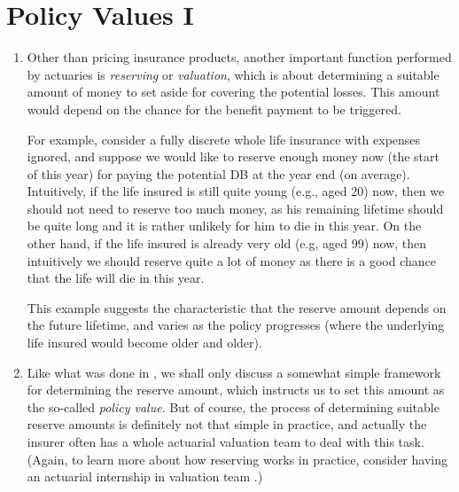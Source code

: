 \section{Policy Values I}
\label{sect:policy-values}
\begin{enumerate}
\item Other than pricing insurance products, another important function
performed by actuaries is \emph{reserving} or \emph{valuation}, which is about
determining a suitable amount of money  to set aside for covering
the potential losses. This amount would depend on the chance for the benefit
payment to be triggered.

For example, consider a fully discrete whole life insurance with expenses
ignored, and suppose we would like to reserve enough money now (the start of
this year) for paying the potential DB at the year end (on average).
Intuitively, if the life insured is still quite young (e.g., aged 20) now, then
we should not need to reserve too much money, as his remaining lifetime should
be quite long  and it is rather unlikely for him to die in this year.
On the other hand, if the life insured is already very old (e.g, aged 99) now,
then intuitively we should reserve quite a lot of money as there is a good
chance that the life will die  in this year.

This example suggests the characteristic that the reserve amount depends on the
future lifetime, and varies as the policy progresses (where the underlying life
insured would become older and older).

\item Like what was done in , we shall only discuss a
somewhat simple framework for determining the reserve amount, which instructs
us to set this amount as the so-called \emph{policy value}. But of course, the
process of determining suitable reserve amounts is definitely not that simple
in practice, and actually the insurer often has a whole actuarial valuation
team to deal with this task. (Again, to learn more about how reserving works in
practice, consider having an actuarial internship in valuation team
.)
\end{enumerate}
